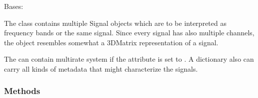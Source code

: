 \documentclass[letterpaper,10pt,english]{sphinxmanual}
\begin{document}
\begin{fulllineitems}
\label{\detokenize{classes:dsptools.classes.multibandsignal.MultiBandSignal}}
\pysigstartsignatures
{}
\pysigstopsignatures
\sphinxAtStartPar
Bases: 

\sphinxAtStartPar
The  class contains multiple Signal objects which are
to be interpreted as frequency bands or the same signal. Since every
signal has also multiple channels, the object resembles somewhat a
3D\sphinxhyphen{}Matrix representation of a signal.

\sphinxAtStartPar
The  can contain multirate system if the attribute
 is set to . A dictionary also can carry
all kinds of metadata that might characterize the signals.
\begin{quote}\begin{description}
\begin{description}
\end{description}

\end{description}\end{quote}
\subsubsection*{Methods}



\end{fulllineitems}
\end{document}
